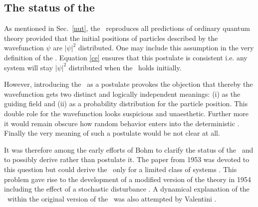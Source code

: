 \subsection{The status of the \qeh}
As mentioned in Sec.~\ref{nut}, the \dbb\ reproduces all predictions of ordinary quantum theory 
provided that the initial positions of particles described by the wavefunction $\psi$ are 
$|\psi|^2$ distributed. One may include this assumption in the very 
definition of the \dbb. Equation \ref{ce} ensures that this postulate is consistent 
i.e. any system will stay $|\psi|^2$ distributed when the \qeh\ holds initially. 

However, introducing the \qeh\ as a postulate provokes the objection that thereby the 
wavefunction gets two distinct and logically independent meanings: (i) as the guiding 
field and (ii) as a probability distribution for the particle position. This double role for the wavefunction looks suspicious and 
unaesthetic. Further more it would remain obscure how random behavior enters into the deterministic \dbb. Finally the 
very meaning of such a postulate would be not clear at all. 

It was therefore among the early efforts of Bohm 
to clarify the status of the \qeh\ and to possibly derive rather than postulate it. 
The paper \cite{bohm2} from 1953 was devoted to this question but could derive the \qeh\ 
only for a limited class of systems \cite{cushing_qm,val-sim}. This problem gave rise to 
the development of a modified version of the theory in 1954 including the effect of 
a stochastic disturbance \cite{bv}. A dynamical explanation of the \qeh\ within the original version of the \dbb\ was also
attempted by Valentini  \cite{valentini}.  

